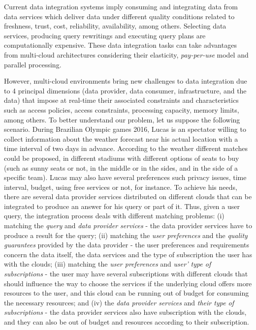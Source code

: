 Current data integration systems imply consuming and integrating data from data services which deliver data under different quality conditions related to freshness, trust, cost, reliability, availability, among others. Selecting data services, producing query rewritings and executing query plans are computationally expensive. These data integration tasks can take advantages from multi-cloud architectures considering their elasticity, \textit{pay-per-use} model and parallel processing.

However, multi-cloud environments bring new challenges to data integration due to 4 principal dimensions (data provider, data consumer, infrastructure, and the data) that impose at real-time their associated constraints and characteristics such as access policies, access constraints, processing capacity, memory limits, among others. 
%
To better understand our problem, let us suppose the following scenario. 
During Brazilian Olympic games 2016, Lucas is an spectator willing to collect information about the weather forecast near his actual location with a time interval of two days in advance. According to the weather different matches could be proposed, in different stadiums with different options of seats to buy (such as sunny seats or not, in the middle or in the sides, and in the side of a specific team).
%
Lucas may also have several preferences such privacy issues, time interval, budget, using free services or not, for instance. 
%
To achieve his needs, there are several data provider services distributed on different clouds that can be integrated to produce an answer for his query or part of it. 
%
Thus, given a user query, the integration process deals with different matching problems: 
(i) matching the \textit{query} and \textit{data provider services} - the data provider services have to produce a result for the query; 
(ii) matching the \textit{user preferences} and the \textit{quality guarantees} provided by the data provider - the user preferences and requirements concern the data itself, the data services and the type of subscription the user has with the clouds; 
(iii) matching the \textit{user preferences} and \textit{user' type of subscriptions} - the user may have several subscriptions with different clouds that should influence the way to choose the services if the underlying cloud offers more resources to the user, and this cloud can be running out of budget for consuming the necessary resources; and 
(iv) the \textit{data provider services} and \textit{their type of subscriptions} - the data provider services also have  subscription with the clouds, and they can also be out of budget and resources according to their subscription.

